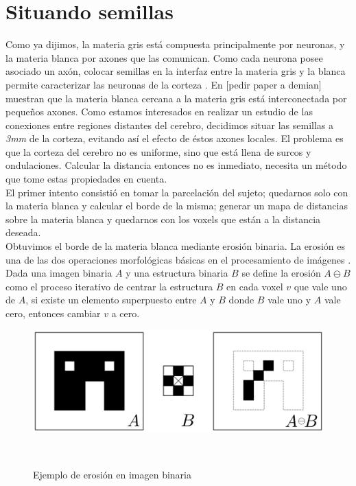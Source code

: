 \section{Situando semillas}
Como ya dijimos, la materia gris est\'a compuesta principalmente por neuronas,
y la materia blanca por axones que las comunican. Como cada neurona
posee asociado un ax\'on, colocar semillas en la interfaz entre la materia gris
y la blanca permite caracterizar las neuronas de la corteza \cite{Mori2002}
\cite{Anwander2006}. En [pedir paper a demian] muestran que la materia blanca
cercana a la materia gris est\'a interconectada por peque\~nos axones. Como
estamos interesados en realizar un estudio de las conexiones entre regiones
distantes del cerebro, decidimos situar las semillas a \textit{3mm} de la corteza,
evitando as\'i el efecto de \'estos axones locales. El problema es que la corteza
del cerebro no es uniforme, sino que est\'a llena de surcos y ondulaciones. 
Calcular la distancia entonces no es inmediato, necesita un m\'etodo que tome
estas propiedades en cuenta. \\

El primer intento consisti\'o en tomar la parcelaci\'on del sujeto; quedarnos solo 
con la materia blanca y calcular el borde de la misma; generar un
mapa de distancias sobre la materia blanca y quedarnos con los voxels que est\'an
a la distancia deseada. \\

Obtuvimos el borde de la materia blanca mediante erosi\'on binaria. La erosi\'on
es una de las dos operaciones morfol\'ogicas b\'asicas en el procesamiento de
im\'agenes \cite{Serra1983}. Dada una imagen binaria $A$ y una estructura binaria
$B$ se define la erosi\'on $ A \ominus B $ como el proceso iterativo de centrar
la estructura $B$ en cada voxel $v$ que vale uno de $A$, si existe un elemento
superpuesto entre $A$ y $B$ donde $B$ vale uno y $A$ vale cero, entonces cambiar
$v$ a cero. \\

\begin{figure}[h!]
                                                                                                                        
\begin{minipage}[b]{\textwidth}
    \includegraphics[width=\textwidth]{img/erosion.png}
    \caption{Ejemplo de erosi\'on en imagen binaria}
\end{minipage} ~

\end{figure}  

